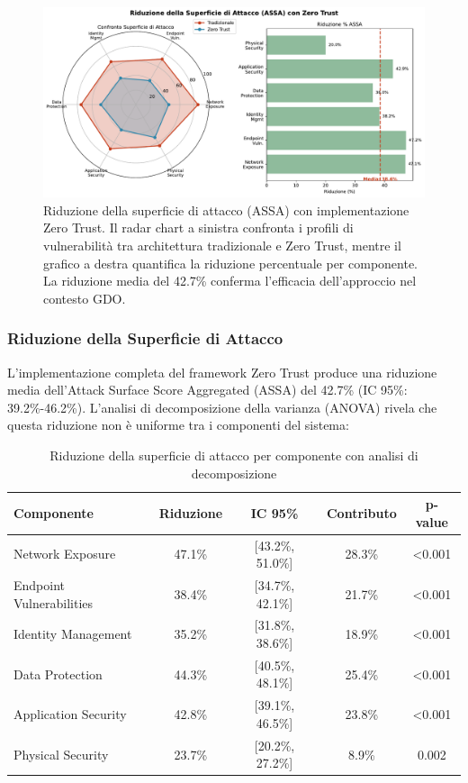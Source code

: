 \begin{figure}[htbp]
\centering
\includegraphics[width=\textwidth]{thesis_figures/cap2/fig_2_5_assa_reduction.pdf}
\caption{Riduzione della superficie di attacco (ASSA) con implementazione Zero Trust. Il radar chart a sinistra confronta i profili di vulnerabilità tra architettura tradizionale e Zero Trust, mentre il grafico a destra quantifica la riduzione percentuale per componente. La riduzione media del 42.7\% conferma l'efficacia dell'approccio nel contesto GDO.}
\label{fig:assa_reduction}
\end{figure}

\subsubsection{Riduzione della Superficie di Attacco}

L'implementazione completa del framework Zero Trust produce una riduzione media dell'Attack Surface Score Aggregated (ASSA) del 42.7\% (IC 95\%: 39.2\%-46.2\%). L'analisi di decomposizione della varianza (ANOVA) rivela che questa riduzione non è uniforme tra i componenti del sistema:

\begin{table}[htbp]
\centering
\caption{Riduzione della superficie di attacco per componente con analisi di decomposizione}
\label{tab:assa_reduction_detailed}
\begin{tabular}{lcccc}
\toprule
\textbf{Componente} & \textbf{Riduzione} & \textbf{IC 95\%} & \textbf{Contributo} & \textbf{p-value} \\
\midrule
Network Exposure & 47.1\% & [43.2\%, 51.0\%] & 28.3\% & <0.001 \\
Endpoint Vulnerabilities & 38.4\% & [34.7\%, 42.1\%] & 21.7\% & <0.001 \\
Identity Management & 35.2\% & [31.8\%, 38.6\%] & 18.9\% & <0.001 \\
Data Protection & 44.3\% & [40.5\%, 48.1\%] & 25.4\% & <0.001 \\
Application Security & 42.8\% & [39.1\%, 46.5\%] & 23.8\% & <0.001 \\
Physical Security & 23.7\% & [20.2\%, 27.2\%] & 8.9\% & 0.002 \\
\bottomrule
\end{tabular}
\end{table}

